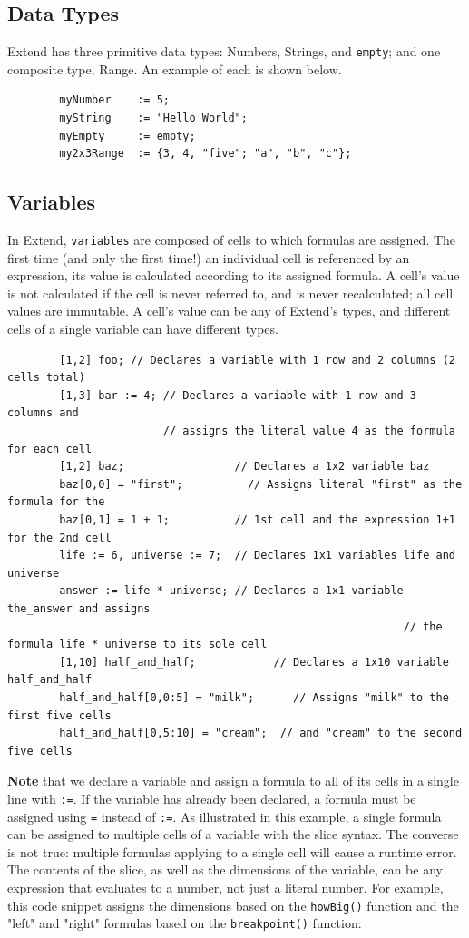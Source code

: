 	\subsection{Data Types}
	Extend has three primitive data types: Numbers, Strings, and \texttt{empty}; and one composite type, Range. An example of each is shown below.

	\begin{lstlisting}
		myNumber    := 5;
		myString    := "Hello World";
		myEmpty     := empty;
		my2x3Range  := {3, 4, "five"; "a", "b", "c"};
	\end{lstlisting}

	\subsection{Variables}
	In Extend, \texttt{variables} are composed of cells to which formulas are assigned. The first time (and only the first time!) an individual cell is referenced by an expression, its value is calculated according to its assigned formula. A cell's value is not calculated if the cell is never referred to, and is never recalculated; all cell values are immutable. A cell's value can be any of Extend's types, and different cells of a single variable can have different types.

	\begin{lstlisting}
		[1,2] foo; // Declares a variable with 1 row and 2 columns (2 cells total)
		[1,3] bar := 4; // Declares a variable with 1 row and 3 columns and
		                // assigns the literal value 4 as the formula for each cell
		[1,2] baz;                 // Declares a 1x2 variable baz
		baz[0,0] = "first";   		 // Assigns literal "first" as the formula for the
		baz[0,1] = 1 + 1;          // 1st cell and the expression 1+1 for the 2nd cell
		life := 6, universe := 7;  // Declares 1x1 variables life and universe
		answer := life * universe; // Declares a 1x1 variable the_answer and assigns
															 // the formula life * universe to its sole cell
		[1,10] half_and_half;			 // Declares a 1x10 variable half_and_half
		half_and_half[0,0:5] = "milk";		// Assigns "milk" to the first five cells
		half_and_half[0,5:10] = "cream";  // and "cream" to the second five cells
	\end{lstlisting}

	\medskip \noindent
	\textbf{Note} that we declare a variable and assign a formula to all of its cells in a single line with \texttt{:=}. If the variable has already been declared, a formula must be assigned using \texttt{=} instead of \texttt{:=}. As illustrated in this example, a single formula can be assigned to multiple cells of a variable with the slice syntax. The converse is not true: multiple formulas applying to a single cell will cause a runtime error. The contents of the slice, as well as the dimensions of the variable, can be any expression that evaluates to a number, not just a literal number. For example, this code snippet assigns the dimensions based on the \texttt{howBig()} function and the "left" and "right" formulas based on the \texttt{breakpoint()} function:

